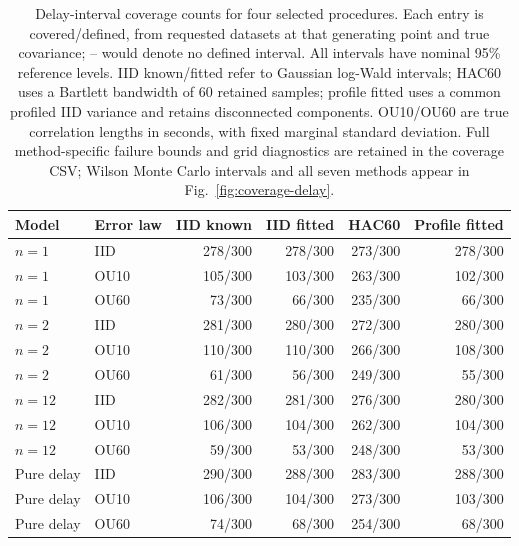 \begin{table}[tbp]
\centering\small
\begin{tabular}{llrrrr}
\toprule
Model & Error law & IID known & IID fitted & HAC60 & Profile fitted \\
\midrule
$n=1$ & IID & 278/300 & 278/300 & 273/300 & 278/300 \\
$n=1$ & OU10 & 105/300 & 103/300 & 263/300 & 102/300 \\
$n=1$ & OU60 & 73/300 & 66/300 & 235/300 & 66/300 \\
$n=2$ & IID & 281/300 & 280/300 & 272/300 & 280/300 \\
$n=2$ & OU10 & 110/300 & 110/300 & 266/300 & 108/300 \\
$n=2$ & OU60 & 61/300 & 56/300 & 249/300 & 55/300 \\
$n=12$ & IID & 282/300 & 281/300 & 276/300 & 280/300 \\
$n=12$ & OU10 & 106/300 & 104/300 & 262/300 & 104/300 \\
$n=12$ & OU60 & 59/300 & 53/300 & 248/300 & 53/300 \\
Pure delay & IID & 290/300 & 288/300 & 283/300 & 288/300 \\
Pure delay & OU10 & 106/300 & 104/300 & 273/300 & 103/300 \\
Pure delay & OU60 & 74/300 & 68/300 & 254/300 & 68/300 \\
\bottomrule
\end{tabular}
\caption{Delay-interval coverage counts for four selected procedures. Each entry is covered/defined, from \CoverageReplicates{} requested datasets at that generating point and true covariance; -- would denote no defined interval. All intervals have nominal 95\% reference levels. IID known/fitted refer to Gaussian log-Wald intervals; HAC60 uses a Bartlett bandwidth of 60 retained samples; profile fitted uses a common profiled IID variance and retains disconnected components. OU10/OU60 are true correlation lengths in seconds, with fixed marginal standard deviation. Full method-specific failure bounds and grid diagnostics are retained in the coverage CSV; Wilson Monte Carlo intervals and all seven methods appear in Fig.~\ref{fig:coverage-delay}.}
\label{tab:coverage-delay}
\end{table}
